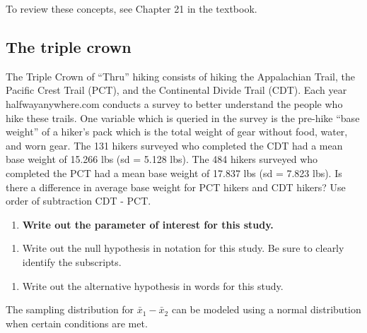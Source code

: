 \documentclass[
]{report}
\providecommand{\tightlist}{%
  \setlength{\itemsep}{0pt}\setlength{\parskip}{0pt}}
\begin{document}
To review these concepts, see Chapter 21 in the textbook.

\hypertarget{the-triple-crown}{%
\subsection{The triple crown}\label{the-triple-crown}}

The Triple Crown of ``Thru'' hiking consists of hiking the Appalachian Trail, the Pacific Crest Trail (PCT), and the Continental Divide Trail (CDT). Each year halfwayanywhere.com conducts a survey to better understand the people who hike these trails. One variable which is queried in the survey is the pre-hike ``base weight'' of a hiker's pack which is the total weight of gear without food, water, and worn gear. The 131 hikers surveyed who completed the CDT had a mean base weight of 15.266 lbs (sd = 5.128 lbs). The 484 hikers surveyed who completed the PCT had a mean base weight of 17.837 lbs (sd = 7.823 lbs). Is there a difference in average base weight for PCT hikers and CDT hikers? Use order of subtraction CDT - PCT.

\begin{enumerate}
\def\labelenumi{\arabic{enumi}.}
\tightlist
\item
  \textbf{Write out the parameter of interest for this study.}
\end{enumerate}

\vspace{0.8in}

\begin{enumerate}
\def\labelenumi{\arabic{enumi}.}
\setcounter{enumi}{1}
\tightlist
\item
  Write out the null hypothesis in notation for this study. Be sure to clearly identify the subscripts.
\end{enumerate}

\vspace{0.5in}

\begin{enumerate}
\def\labelenumi{\arabic{enumi}.}
\setcounter{enumi}{2}
\tightlist
\item
  Write out the alternative hypothesis in words for this study.
\end{enumerate}

\vspace{0.8in}

The sampling distribution for \(\bar{x}_1-\bar{x}_2\) can be modeled using a normal distribution when certain conditions are met.
\end{document}

